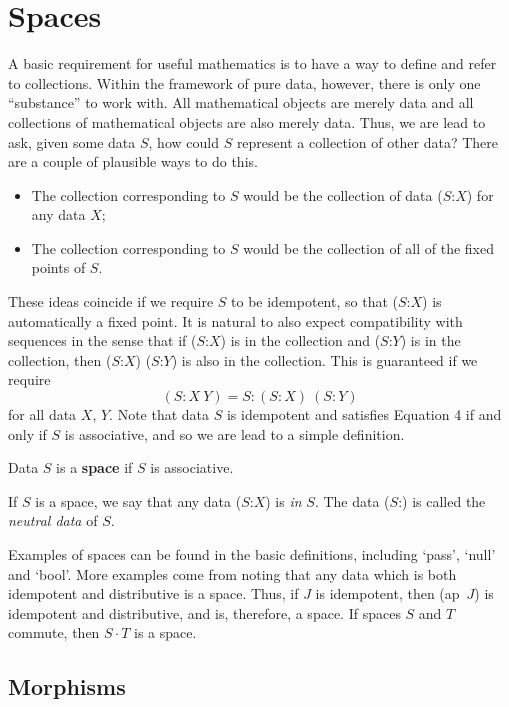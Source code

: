 \documentclass[11pt]{article}
\begin{document}
\section{Spaces}

      A basic requirement for useful mathematics is to have a way to define and refer to collections.  
Within the framework of pure data, however, there is only one ``substance'' to work with.  All mathematical objects are merely data and 
all collections of mathematical objects are also merely data.  
Thus, we are lead to ask, given some data $S$, how could $S$ represent a collection of other data?  
There are a couple of plausible ways to do this.  
\begin{itemize} 
\item The collection corresponding to $S$ would be the collection of data ($S$:$X$) for any data $X$;
\item The collection corresponding to $S$ would be the collection of all of the fixed points of $S$.  
\end{itemize}
These ideas coincide if we require $S$ to be idempotent, so that ($S$:$X$) is automatically a fixed point.  It is natural to also expect compatibility with 
sequences in the sense that if ($S$:$X$) is in the collection and ($S$:$Y$) is in the collection, then ($S$:$X$) ($S$:$Y$) is also in the collection.  
This is guaranteed if we require 
\begin{equation}
(S : X\ Y) = S : (S:X)\ (S:Y)
\end{equation}
for all data $X$, $Y$.  
Note that data $S$ is idempotent and satisfies Equation 4 if and only if $S$ is associative, and so we are lead 
to a simple definition.
\begin{definition} Data $S$ is a {\bf space} if $S$ is associative.
\end{definition}
\noindent If $S$ is a space, we say that any data ($S$:$X$) is {\it in} $S$.  
The data ($S$:) is called the {\it neutral data} of $S$.  

Examples of spaces can be found in the basic definitions, including `pass', `null' and `bool'.  More examples come from 
noting that any data which is both idempotent and distributive is a space.  Thus, if $J$ is idempotent, then (ap\ $J$) is idempotent and 
distributive, and is, therefore, a space.  If spaces $S$ and $T$ commute, then $S\cdot T$ is a space.    

\subsection{Morphisms} 
\end{document}
